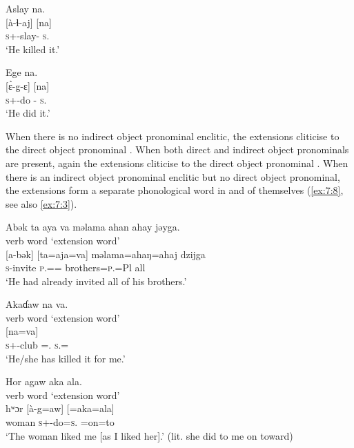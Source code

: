 \ea\label{ex:7:4}
Aslay na.\\
\gll {}[à-ɬ{}-aj] \hspace{35pt}   [na]\\
\textsc{s}+{\PFV}-slay-{\CL} {} \textsc{s}.{\DO}\\
\glt ‘He killed it.’
\z

\ea\label{ex:7:5}
Ege   na.\\
\gll {}[\`ɛ-g-ɛ]  \hspace{45pt}  [na]\\
\textsc{s}+{\PFV}-do -{\CL}{} \textsc{s}.{\DO}\\
\glt ‘He did it.’
\z

 When there is no  indirect object pronominal enclitic, the extensions cliticise to the direct object pronominal . When both direct and indirect object pronominals are present, again the extensions cliticise to the direct object pronominal  . When there is an indirect object pronominal enclitic but no direct object pronominal, the extensions form a separate phonological word in and of themselves (\ref{ex:7:8}, see also \ref{ex:7:3}). 

\ea\label{ex:7:6}
Abək  ta  aya  va  məlama  ahan  ahay  jəyga.\\
 verb word \hspace{9pt} ‘extension word’\\
\gll {}[a-bək] \hspace{15pt}  [ta=aja=va]  \hspace{10pt}  məlama=ahaŋ=ahaj  dzijga\\
\textsc{s}-invite \hspace{15pt}  \textsc{p}.{\DO}={\PLU}={\PRF} {}  brothers=\textsc{p}.{\POSS}=Pl  all\\
\glt ‘He had already invited all of his brothers.’  
\z

\ea\label{ex:7:7}
Akaɗaw  na  va. \\
verb word  \hspace{36pt}        ‘extension word’\\
\gll\relax [à-kaɗ=aw]  {}  [na=va]\\
\textsc{s}+{\PFV}-club ={\oneS}.{\IO}    \textsc{s}.{\DO}={\PRF}\\
\glt ‘He/she has killed it for me.’ 
\z

\ea\label{ex:7:8}
Hor  agaw  aka  ala.\\
\hspace{30pt} verb word \hspace{28pt} ‘extension word’\\
\gll hʷɔr    [à-g=aw]     [=aka=ala]\\
woman  \textsc{s}+{\PFV}-do=\textsc{s}.{\IO}   =on=to\\
\glt ‘The woman liked me [as I liked her].’ (lit. she did to me on toward)  
\z

